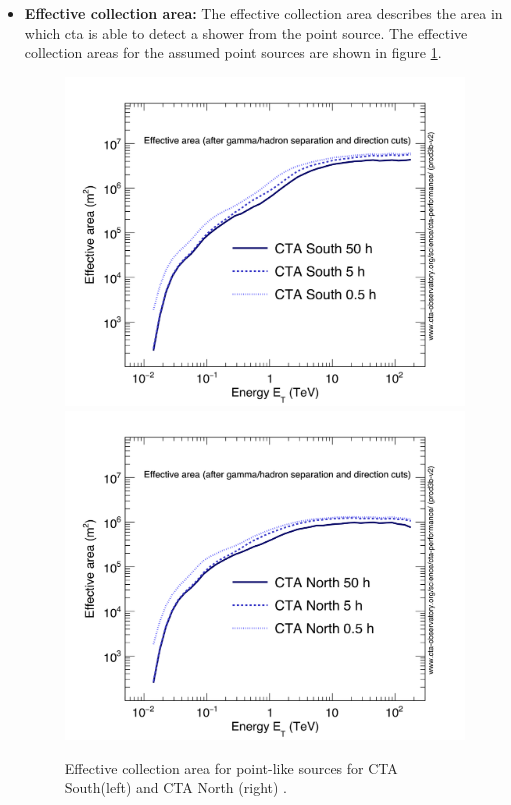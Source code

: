 \documentclass[main.tex]{subfiles}
\begin{document}
\begin{itemize}
\item \textbf{Effective collection area:} The effective collection area describes the area in which \gls{cta} is able to detect a shower from the point source. The effective collection areas for the assumed point sources are shown in figure \ref{fig:effarea}.\\

\begin{figure}[!htb]
\includegraphics[width=\linewidth]{Pictures/CTA-Performance-prod3b-v2-South-20deg-EffectiveArea.pdf}
\endminipage\hfill
{}
\includegraphics[width=\linewidth]{Pictures/CTA-Performance-prod3b-v2-North-20deg-EffectiveArea.pdf}
\endminipage\hfill
\caption{\label{fig:effarea}Effective collection area for point-like sources for CTA South(left) and CTA North (right) \cite{CTAPerformance}.}
\end{figure}


\end{itemize}
\end{document}
